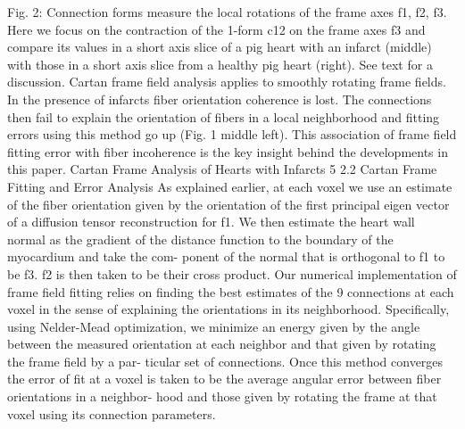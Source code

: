  Fig. 2: Connection forms measure the local rotations of the frame axes f1, f2, f3. Here we focus on the contraction of the 1-form c12 on the frame axes f3 and compare its values in a short axis slice of a pig heart with an infarct (middle) with those in a short axis slice from a healthy pig heart (right). See text for a discussion.
Cartan frame field analysis applies to smoothly rotating frame fields. In the presence of infarcts fiber orientation coherence is lost. The connections then fail to explain the orientation of fibers in a local neighborhood and fitting errors using this method go up (Fig. 1 middle left). This association of frame field fitting error with fiber incoherence is the key insight behind the developments in this paper.
Cartan Frame Analysis of Hearts with Infarcts 5
2.2 Cartan Frame Fitting and Error Analysis
As explained earlier, at each voxel we use an estimate of the fiber orientation given by the orientation of the first principal eigen vector of a diffusion tensor reconstruction for f1. We then estimate the heart wall normal as the gradient of the distance function to the boundary of the myocardium and take the com- ponent of the normal that is orthogonal to f1 to be f3. f2 is then taken to be their cross product. Our numerical implementation of frame field fitting relies on finding the best estimates of the 9 connections at each voxel in the sense of explaining the orientations in its neighborhood. Specifically, using Nelder-Mead optimization, we minimize an energy given by the angle between the measured orientation at each neighbor and that given by rotating the frame field by a par- ticular set of connections. Once this method converges the error of fit at a voxel is taken to be the average angular error between fiber orientations in a neighbor- hood and those given by rotating the frame at that voxel using its connection parameters.